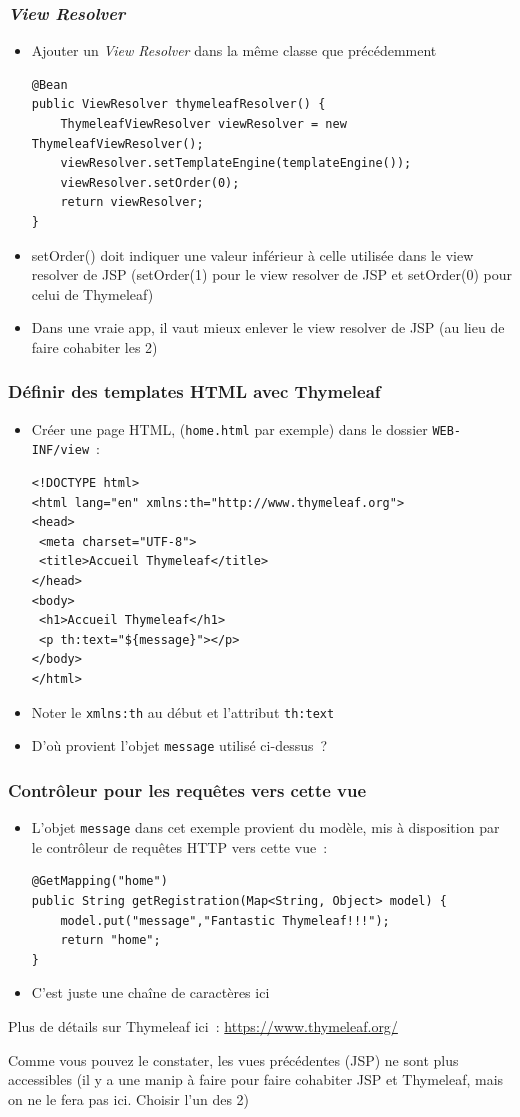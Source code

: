 \documentclass{beamer}
\begin{document}
\begin{frame}[fragile]
	\frametitle{\textit{View Resolver}}
	\begin{itemize}
		\item Ajouter un \textit{View Resolver} dans la même classe que précédemment
\begin{lstlisting}
@Bean
public ViewResolver thymeleafResolver() {
	ThymeleafViewResolver viewResolver = new ThymeleafViewResolver();
	viewResolver.setTemplateEngine(templateEngine());
	viewResolver.setOrder(0);
	return viewResolver;
}
\end{lstlisting}
		\item setOrder() doit indiquer une valeur inférieur à celle utilisée dans le view resolver de JSP (setOrder(1) pour le view resolver de JSP et setOrder(0) pour celui de Thymeleaf)
		\item Dans une vraie app, il vaut mieux enlever le view resolver de JSP (au lieu de faire cohabiter les 2)
	\end{itemize}
\end{frame} 

\begin{frame}[fragile]
	\frametitle{Définir des templates HTML avec Thymeleaf}
	\begin{itemize}
		\item Créer une page HTML, (\texttt{home.html} par exemple) dans le dossier \texttt{WEB-INF/view}~:
\begin{lstlisting}
<!DOCTYPE html>
<html lang="en" xmlns:th="http://www.thymeleaf.org">
<head>
 <meta charset="UTF-8">
 <title>Accueil Thymeleaf</title>
</head>
<body>
 <h1>Accueil Thymeleaf</h1>
 <p th:text="${message}"></p>
</body>
</html>
\end{lstlisting}
\item Noter le \texttt{xmlns:th} au début et l'attribut
 \texttt{th:text}
 \item D'où provient l'objet \texttt{message} utilisé ci-dessus~?
	\end{itemize}
\end{frame}

\begin{frame}[fragile]
	\frametitle{Contrôleur pour les requêtes vers cette vue}
	\begin{itemize}
		\item L'objet \texttt{message} dans cet exemple provient du modèle, mis à disposition par le contrôleur de requêtes HTTP vers cette vue~:
		
\begin{lstlisting}
@GetMapping("home")
public String getRegistration(Map<String, Object> model) {
	model.put("message","Fantastic Thymeleaf!!!");
	return "home";
}
\end{lstlisting}
\item C'est juste une chaîne de caractères ici
	\end{itemize}
Plus de détails sur Thymeleaf ici~: \url{https://www.thymeleaf.org/}

Comme vous pouvez le constater, les vues précédentes (JSP) ne sont plus accessibles (il y a une manip à faire pour faire cohabiter JSP et Thymeleaf, mais on ne le fera pas ici. Choisir l'un des 2)

\end{frame} 
\end{document}
